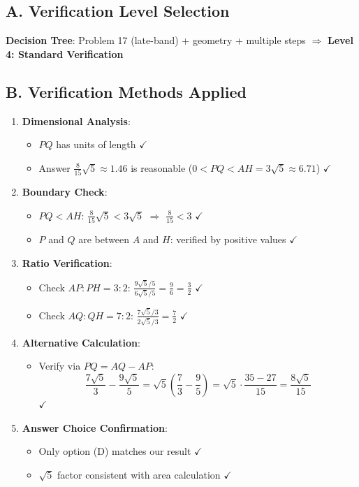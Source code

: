 \documentclass[12pt]{article}
\begin{document}
\begin{verificationbox}
\subsection*{A. Verification Level Selection}
\textbf{Decision Tree}: Problem 17 (late-band) + geometry + multiple steps $\Rightarrow$ \textbf{Level 4: Standard Verification}

\subsection*{B. Verification Methods Applied}
\begin{enumerate}
    \item \textbf{Dimensional Analysis}:
    \begin{itemize}
        \item $PQ$ has units of length $\checkmark$
        \item Answer $\frac{8}{15}\sqrt{5} \approx 1.46$ is reasonable ($0 < PQ < AH = 3\sqrt{5} \approx 6.71$) $\checkmark$
    \end{itemize}
    \item \textbf{Boundary Check}:
    \begin{itemize}
        \item $PQ < AH$: $\frac{8}{15}\sqrt{5} < 3\sqrt{5}$ $\Rightarrow$ $\frac{8}{15} < 3$ $\checkmark$
        \item $P$ and $Q$ are between $A$ and $H$: verified by positive values $\checkmark$
    \end{itemize}
    \item \textbf{Ratio Verification}:
    \begin{itemize}
        \item Check $AP:PH = 3:2$: $\frac{9\sqrt{5}/5}{6\sqrt{5}/5} = \frac{9}{6} = \frac{3}{2}$ $\checkmark$
        \item Check $AQ:QH = 7:2$: $\frac{7\sqrt{5}/3}{2\sqrt{5}/3} = \frac{7}{2}$ $\checkmark$
    \end{itemize}
    \item \textbf{Alternative Calculation}:
    \begin{itemize}
        \item Verify via $PQ = AQ - AP$:
        $$\frac{7\sqrt{5}}{3} - \frac{9\sqrt{5}}{5} = \sqrt{5}\left(\frac{7}{3} - \frac{9}{5}\right) = \sqrt{5} \cdot \frac{35-27}{15} = \frac{8\sqrt{5}}{15}$$ $\checkmark$
    \end{itemize}
    \item \textbf{Answer Choice Confirmation}:
    \begin{itemize}
        \item Only option (D) matches our result $\checkmark$
        \item $\sqrt{5}$ factor consistent with area calculation $\checkmark$
    \end{itemize}
\end{enumerate}


\end{verificationbox}
\end{document}
